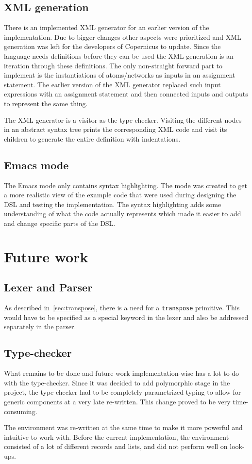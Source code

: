 \subsection{XML generation}\label{sec:xml}
There is an implemented XML generator for an earlier version of the
implementation. Due to bigger changes other aspects were prioritized
and XML generation was left for the developers of Copernicus to
update. Since the language needs definitions before they can be used
the XML generation is an iteration through these definitions. The only
non-straight forward part to implement is the instantiations of
atoms/networks as inputs in an assignment statement. The earlier
version of the XML generator replaced such input expressions with an
assignment statement and then connected inputs and outputs to
represent the same thing.

The XML generator is a visitor as the type checker. Visiting the
different nodes in an abstract syntax tree prints the corresponding
XML code and visit its children to generate the entire definition with
indentations.

\subsection{Emacs mode}\label{sec:emacs}
The Emacs mode only contains syntax highlighting. The mode was created
to get a more realistic view of the example code that were used during
designing the DSL and testing the implementation. The syntax
highlighting adds some understanding of what the code actually
represents which made it easier to add and change specific parts of
the DSL.

\section{Future work}

\subsection{Lexer and Parser}
As described in~\autoref{sec:transpose}, there is a need for a
\texttt{transpose} primitive. This would have to be specified as a
special keyword in the lexer and also be addressed separately in the
parser.


\subsection{Type-checker}
What remains to be done and future work implementation-wise has a lot
to do with the type-checker. Since it was decided to add polymorphic
stage in the project, the type-checker had to be completely
parametrized typing to allow for generic components at a very late
re-written. This change proved to be very time-consuming.

The environment was re-written at the same time to make it more
powerful and intuitive to work with. Before the current
implementation, the environment consisted of a lot of different
records and lists, and did not perform well on look-ups.
